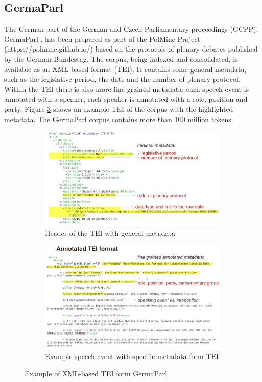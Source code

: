 \documentclass{article}
\begin{document}
\subsection{GermaParl}

The German part of the German and Czech Parliamentary proceedings (GCPP), GermaParl \parencite{germaparl}, has been prepared as part of the PolMine Project (https://polmine.github.io/) based on the protocols of plenary debates published by the German Bundestag. 
The corpus, being indexed and consolidated, is available as an XML-based format (TEI). It contains some general metadata, such as the legislative period, the date and the number of plenary protocol. Within the TEI there is also more fine-grained metadata: each speech event is annotated with a speaker, each speaker is annotated with a role, position and party. Figure \ref{fig:TEI} shows an example TEI of the corpus with the highlighted metadata. The GermaParl corpus contains more than 100 million tokens.
\begin{figure}
\centering
\begin{subfigure}{0.5\textwidth}
  \centering
  \includegraphics[width=\textwidth]{tei1.png}
  \caption{Header of the TEI with general metadata}
  \label{fig:sub1}
\end{subfigure}%
\begin{subfigure}{0.5\textwidth}
  \centering
  \includegraphics[width=\textwidth]{tei2.png}
  \caption{Example speech event with specific metadata form TEI}
  \label{fig:sub2}
\end{subfigure}
\caption{Example of XML-based TEI form GermaParl}
\label{fig:TEI}
\end{figure}
\end{document}
